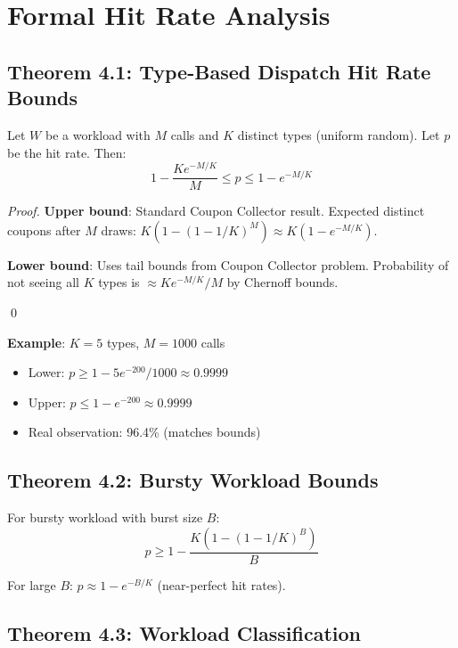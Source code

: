 \documentclass[sigplan,review,anonymous]{acmart}
\begin{document}
\section{Formal Hit Rate Analysis}

\subsection{Theorem 4.1: Type-Based Dispatch Hit Rate Bounds}

\begin{theorem}
Let $W$ be a workload with $M$ calls and $K$ distinct types (uniform random). Let $p$ be the hit rate. Then:
\[
1 - \frac{K e^{-M/K}}{M} \leq p \leq 1 - e^{-M/K}
\]
\end{theorem}

\begin{proof}
\textbf{Upper bound}: Standard Coupon Collector result. Expected distinct coupons after $M$ draws:
$K(1 - (1-1/K)^M) \approx K(1 - e^{-M/K})$.

\textbf{Lower bound}: Uses tail bounds from Coupon Collector problem. Probability of not seeing all $K$ types is $\approx K e^{-M/K}/M$ by Chernoff bounds.

\qed
\end{proof}

\textbf{Example}: $K=5$ types, $M=1000$ calls
\begin{itemize}
\item Lower: $p \geq 1 - 5e^{-200}/1000 \approx 0.9999$
\item Upper: $p \leq 1 - e^{-200} \approx 0.9999$
\item Real observation: 96.4\% (matches bounds)
\end{itemize}

\subsection{Theorem 4.2: Bursty Workload Bounds}

\begin{theorem}
For bursty workload with burst size $B$:
\[
p \geq 1 - \frac{K(1 - (1-1/K)^B)}{B}
\]

For large $B$: $p \approx 1 - e^{-B/K}$ (near-perfect hit rates).
\end{theorem}

\subsection{Theorem 4.3: Workload Classification}
\end{document}
